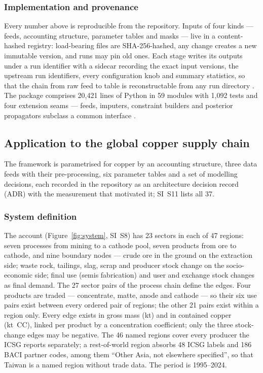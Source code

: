 \subsubsection{Implementation and provenance}\label{sec:software}

Every number above is reproducible from the repository. Inputs of four
kinds --- feeds, accounting structure, parameter tables and masks --- live
in a content-hashed registry: load-bearing files are SHA-256-hashed, any
change creates a new immutable version, and runs may pin old ones. Each stage
writes its outputs under a run identifier with a sidecar recording the exact
input versions, the upstream run identifiers, every configuration knob and
summary statistics, so that the chain from raw feed to table is
reconstructable from any run directory \citep{pauliuk2024traceability,
stodden2014best, wilkinson2016fair}. The package comprises 20{,}421 lines of
Python in 59 modules with 1{,}092 tests and four extension seams --- feeds,
imputers, constraint builders and posterior propagators subclass a common
interface \citep{pauliuk2015transparency, pauliuk2020cumulative}.

\subsection{Application to the global copper supply chain}\label{sec:application}

The framework is parametrised for copper by an accounting structure, three
data feeds with their pre-processing, six parameter tables and a set of
modelling decisions, each recorded in the repository as an architecture
decision record (ADR) with the measurement that motivated it; SI~S11 lists
all 37.

\subsubsection{System definition}\label{sec:system}

The account (Figure~\ref{fig:system}, SI~S8) has 23 sectors in each of 47
regions: seven processes from mining to a cathode pool, seven products from
ore to cathode, and nine boundary nodes --- crude ore in the ground on the
extraction side; waste rock, tailings, slag, scrap and producer stock change
on the socio-economic side; final use (semis fabrication) and user and
exchange stock changes as final demand. The 27 sector pairs of the process
chain define the edges. Four products are traded --- concentrate, matte,
anode and cathode --- so their six use pairs exist between every ordered
pair of regions; the other 21 pairs exist within a region only. Every edge
exists in gross mass (kt) and in contained copper (kt~CC), linked per product
by a concentration coefficient; only the three stock-change edges may be
negative. The 46 named regions cover every producer the ICSG reports
separately; a rest-of-world region absorbs 48 ICSG labels and 186 BACI
partner codes, among them ``Other Asia, not elsewhere specified'', so that
Taiwan is a named region without trade data. The period is 1995--2024.

